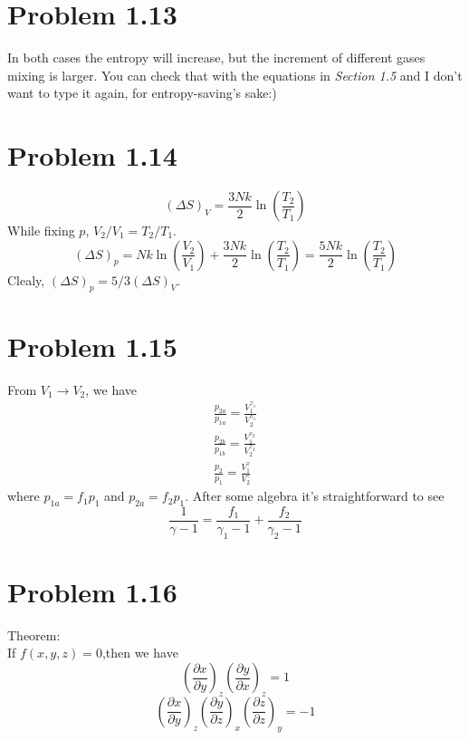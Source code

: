 \documentclass{article}
\begin{document}
\section*{Problem 1.13}
In both cases the entropy will increase, but the increment of different gases mixing is larger. You can check that with the equations in \emph{Section 1.5} and I don't want to type it again, for entropy-saving's sake:)

\section*{Problem 1.14}
\begin{equation}
(\Delta S)_{V}= \frac{3Nk}{2} \ln(\frac{T_{2}}{T_{1}})
\end{equation}
While fixing $p$, $V_{2}/V_{1} = T_{2}/T_{1}$.
\begin{equation}
(\Delta S)_{p}= Nk \ln(\frac{V_{2}}{V_{1}}) +\frac{3Nk}{2} \ln(\frac{T_{2}}{T_{1}}) = \frac{5Nk}{2} \ln(\frac{T_{2}}{T_{1}})
\end{equation}
Clealy, $(\Delta S)_{p} = 5/3 (\Delta S)_{V}$.


\section*{Problem 1.15}
From $V_{1} \rightarrow V_{2}$, we have
\begin{align}
\frac{p_{2a}}{p_{1a}} = \frac{V^{\gamma_{1}}_{1}}{V^{\gamma_{1}}_{2}} \\
\frac{p_{2b}}{p_{1b}} = \frac{V^{\gamma_{2}}_{1}}{V^{\gamma_{2}}_{2}} \\
\frac{p_{2}}{p_{1}} = \frac{V^{\gamma}_{1}}{V^{\gamma}_{2}}
\end{align}
where $p_{1a} = f_{1} p_{1}$ and $p_{2a} = f_{2} p_{1}$. 
After some algebra it's straightforward to see 
\begin{equation}
\frac{1}{\gamma-1} = \frac{f_{1}}{\gamma_{1}-1}+\frac{f_{2}}{\gamma_{2}-1}
\end{equation}


\section*{Problem 1.16}
Theorem:\\
If $f(x,y,z)=0$,then we have
\[\left(\frac{\partial x}{\partial y}\right)_z \left(\frac{\partial y}{\partial x}\right)_z =1\]
\[\left(\frac{\partial x}{\partial y}\right)_z \left(\frac{\partial y}{\partial z}\right)_x \left(\frac{\partial z}{\partial z}\right)_y=-1\]
\end{document}
